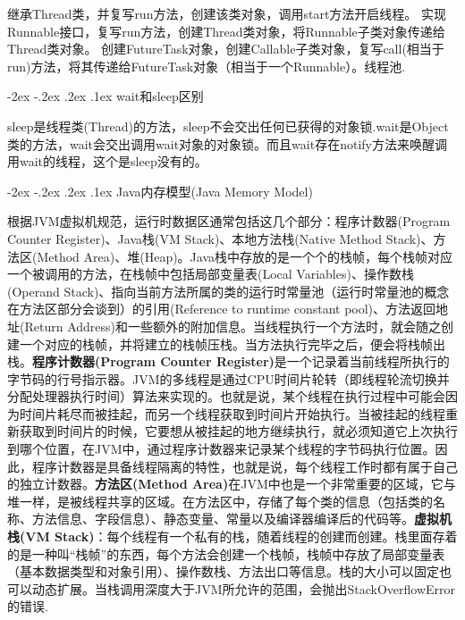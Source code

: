 \documentclass[8pt]{book}
\makeatletter
\numberwithin{dummy}{section}
\theoremstyle{ocrenumbox}
\theoremstyle{blacknumex}
\theoremstyle{blacknumbox}
\theoremstyle{ocrenum}
\renewcommand\paragraph{\@startsection{paragraph}{4}{\z@}
	{-2ex \@plus-.2ex \@minus .2ex}
	{.1ex}
	{\normalfont\small\sffamily\bfseries}}
\makeatother
\begin{document}
继承Thread类，并复写run方法，创建该类对象，调用start方法开启线程。
实现Runnable接口，复写run方法，创建Thread类对象，将Runnable子类对象传递给Thread类对象。
创建FutureTask对象，创建Callable子类对象，复写call(相当于run)方法，将其传递给FutureTask对象（相当于一个Runnable）。线程池.

\paragraph{wait和sleep区别}

sleep是线程类(Thread)的方法，sleep不会交出任何已获得的对象锁.wait是Object类的方法，wait会交出调用wait对象的对象锁。而且wait存在notify方法来唤醒调用wait的线程，这个是sleep没有的。

\paragraph{Java内存模型(Java Memory Model)}

根据JVM虚拟机规范，运行时数据区通常包括这几个部分：程序计数器(Program Counter Register)、Java栈(VM Stack)、本地方法栈(Native Method Stack)、方法区(Method Area)、堆(Heap)。Java栈中存放的是一个个的栈帧，每个栈帧对应一个被调用的方法，在栈帧中包括局部变量表(Local Variables)、操作数栈(Operand Stack)、指向当前方法所属的类的运行时常量池（运行时常量池的概念在方法区部分会谈到）的引用(Reference to runtime constant pool)、方法返回地址(Return Address)和一些额外的附加信息。当线程执行一个方法时，就会随之创建一个对应的栈帧，并将建立的栈帧压栈。当方法执行完毕之后，便会将栈帧出栈。\textbf{程序计数器(Program Counter Register)}是一个记录着当前线程所执行的字节码的行号指示器。JVM的多线程是通过CPU时间片轮转（即线程轮流切换并分配处理器执行时间）算法来实现的。也就是说，某个线程在执行过程中可能会因为时间片耗尽而被挂起，而另一个线程获取到时间片开始执行。当被挂起的线程重新获取到时间片的时候，它要想从被挂起的地方继续执行，就必须知道它上次执行到哪个位置，在JVM中，通过程序计数器来记录某个线程的字节码执行位置。因此，程序计数器是具备线程隔离的特性，也就是说，每个线程工作时都有属于自己的独立计数器。\textbf{方法区(Method Area)}在JVM中也是一个非常重要的区域，它与堆一样，是被线程共享的区域。在方法区中，存储了每个类的信息（包括类的名称、方法信息、字段信息）、静态变量、常量以及编译器编译后的代码等。\textbf{虚拟机栈(VM Stack)}：每个线程有一个私有的栈，随着线程的创建而创建。栈里面存着的是一种叫“栈帧”的东西，每个方法会创建一个栈帧，栈帧中存放了局部变量表（基本数据类型和对象引用）、操作数栈、方法出口等信息。栈的大小可以固定也可以动态扩展。当栈调用深度大于JVM所允许的范围，会抛出StackOverflowError的错误.
\end{document}
